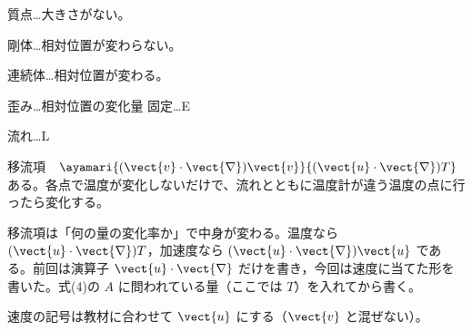 質点…大きさがない。

剛体…相対位置が変わらない。

連続体…相対位置が変わる。

歪み…相対位置の変化量
固定…E

流れ…L

移流項　$\ayamari{(\vect{v}\cdot\vect{\nabla})\vect{v}}{(\vect{u}\cdot\vect{\nabla})T}$
ある。各点で温度が変化しないだけで、流れとともに温度計が違う温度の点に行ったら変化する。
\item {}移流項は「何の量の変化率か」で中身が変わる。温度なら $(\vect{u}\cdot\vect{\nabla})T$，加速度なら $(\vect{u}\cdot\vect{\nabla})\vect{u}$ である。前回は演算子 $\vect{u}\cdot\vect{\nabla}$ だけを書き，今回は速度に当てた形を書いた。式(4)の $A$ に問われている量（ここでは $T$）を入れてから書く。
\item 速度の記号は教材に合わせて $\vect{u}$ にする（$\vect{v}$ と混ぜない）。
